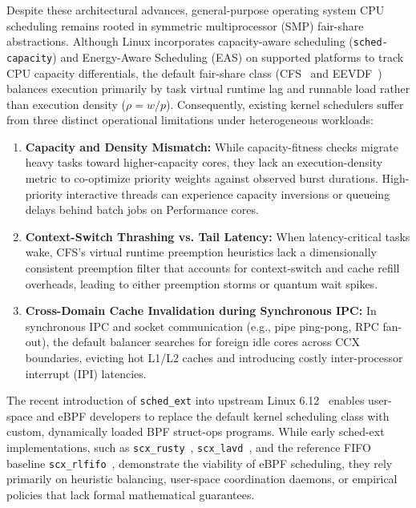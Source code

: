 \documentclass[letterpaper,twocolumn,10pt]{article}
\begin{document}
Despite these architectural advances, general-purpose operating system CPU scheduling remains rooted in symmetric multiprocessor (SMP) fair-share abstractions. Although Linux incorporates capacity-aware scheduling (\texttt{sched-capacity}) and Energy-Aware Scheduling (EAS) on supported platforms to track CPU capacity differentials, the default fair-share class (CFS~\cite{molnar2007cfs} and EEVDF~\cite{zijlstra2023eevdf,stoica1995eevdf}) balances execution primarily by task virtual runtime lag and runnable load rather than execution density ($\rho = w / p$). Consequently, existing kernel schedulers suffer from three distinct operational limitations under heterogeneous workloads:
\begin{enumerate}
    \item \textbf{Capacity and Density Mismatch:} While capacity-fitness checks migrate heavy tasks toward higher-capacity cores, they lack an execution-density metric to co-optimize priority weights against observed burst durations. High-priority interactive threads can experience capacity inversions or queueing delays behind batch jobs on Performance cores.
    \item \textbf{Context-Switch Thrashing vs. Tail Latency:} When latency-critical tasks wake, CFS's virtual runtime preemption heuristics lack a dimensionally consistent preemption filter that accounts for context-switch and cache refill overheads, leading to either preemption storms or quantum wait spikes.
    \item \textbf{Cross-Domain Cache Invalidation during Synchronous IPC:} In synchronous IPC and socket communication (e.g., pipe ping-pong, RPC fan-out), the default balancer searches for foreign idle cores across CCX boundaries, evicting hot L1/L2 caches and introducing costly inter-processor interrupt (IPI) latencies.
\end{enumerate}

The recent introduction of \texttt{sched\_ext} into upstream Linux 6.12~\cite{heo2024schedext,hodges2024schedextscale} enables user-space and eBPF developers to replace the default kernel scheduling class with custom, dynamically loaded BPF struct-ops programs. While early sched-ext implementations, such as \texttt{scx\_rusty}~\cite{hodges2024schedextscale}, \texttt{scx\_lavd}~\cite{min2024scxlavd}, and the reference FIFO baseline \texttt{scx\_rlfifo}~\cite{scx_repo}, demonstrate the viability of eBPF scheduling, they rely primarily on heuristic balancing, user-space coordination daemons, or empirical policies that lack formal mathematical guarantees.
\end{document}

